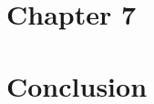 \documentclass[letterpaper,10pt,english]{jupyterBook}
\begin{document}
\chapter{Chapter 7}
\label{\detokenize{Chapter7/Chapter7:chapter-7}}\label{\detokenize{Chapter7/Chapter7::doc}}
\sphinxstepscope


\chapter{Conclusion}
\label{\detokenize{Conclusion/Conclusion:conclusion}}\label{\detokenize{Conclusion/Conclusion::doc}}






\renewcommand{\indexname}{Index}
\printindex
\end{document}
